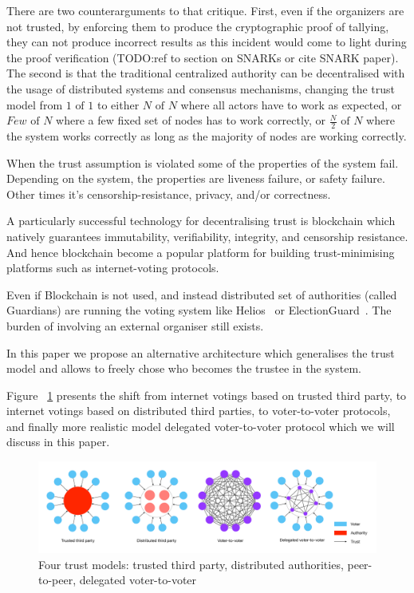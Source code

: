 \documentclass{article}
\begin{document}
There are two counterarguments to that critique. 
First, even if the organizers are not trusted, by enforcing them to produce the cryptographic proof of tallying, they can not produce incorrect results as this incident would come to light during the proof verification (TODO:ref to section on SNARKs or cite SNARK paper).
The second is that the traditional centralized authority can be decentralised with the usage of distributed systems and consensus mechanisms, changing the trust model from $1 \textrm{ of } 1$ to either $N \textrm{ of } N$ where all actors have to work as expected, or $Few \textrm{ of } N$ where a few fixed set of nodes has to work correctly, or $\frac{N}{2} \textrm{ of } N$ where the system works correctly as long as the majority of nodes are working correctly. 

When the trust assumption is violated some of the properties of the system fail. Depending on the system, the properties are liveness failure, or safety failure. Other times it's censorship-resistance, privacy, and/or correctness.

A particularly successful technology for decentralising trust is blockchain which natively guarantees immutability, verifiability, integrity, and censorship resistance. And hence blockchain become a popular platform for building trust-minimising platforms such as internet-voting protocols.

Even if Blockchain is not used, and instead distributed set of authorities (called Guardians) are running the voting system like Helios~\cite{adidaHeliosWebbasedOpenAudit2008} or ElectionGuard~\cite{ElectionGuard}. The burden of involving an external organiser still exists.

In this paper we propose an alternative architecture which generalises the trust model and allows to freely chose who becomes the trustee in the system. 

Figure ~\ref{fig:trust-models} presents the shift from internet votings based on trusted third party, to internet votings based on distributed third parties, to voter-to-voter protocols, and finally more realistic model delegated voter-to-voter protocol which we will discuss in this paper.

\begin{figure}
    \centering
    \includegraphics[width=\textwidth]{trust-models-voting.pdf}
    \caption{Four trust models: trusted third party, distributed authorities, peer-to-peer, delegated voter-to-voter}
    \label{fig:trust-models}
\end{figure}
\end{document}
